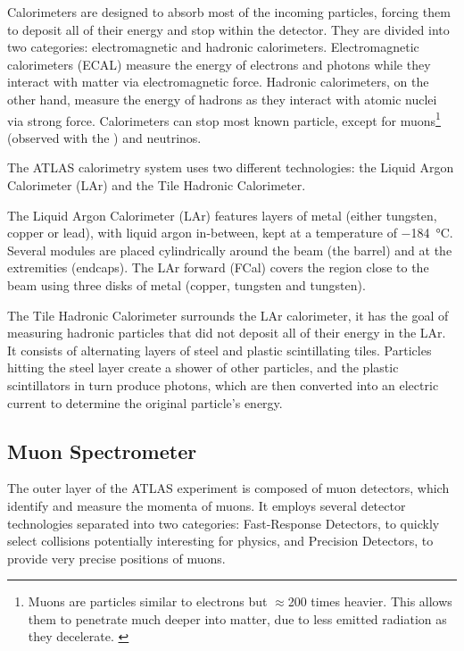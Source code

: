 Calorimeters are designed to absorb most of the incoming particles, forcing them to deposit all of their energy and stop within the detector. They are divided into two categories: electromagnetic and hadronic calorimeters. Electromagnetic calorimeters (ECAL) measure the energy of electrons and photons while they interact with matter via electromagnetic force. Hadronic calorimeters, on the other hand, measure the energy of hadrons as they interact with atomic nuclei via strong force. Calorimeters can stop most known particle, except for muons\footnote{Muons are particles similar to electrons but \(\approx\)200 times heavier. This allows them to penetrate much deeper into matter, due to less emitted radiation as they decelerate. \label{footnote:muons}} (observed with the ) and neutrinos.

The ATLAS calorimetry system uses two different technologies: the Liquid Argon Calorimeter (LAr) and the Tile Hadronic Calorimeter.

The Liquid Argon Calorimeter (LAr) features layers of metal (either tungsten, copper or lead), with liquid argon in-between, kept at a temperature of \qty{-184}{\degreeCelsius}. Several modules are placed cylindrically around the beam (the barrel) and at the extremities (endcaps). The LAr forward (FCal) covers the region close to the beam using three disks of metal (copper, tungsten and tungsten).

The Tile Hadronic Calorimeter surrounds the LAr calorimeter, it has the goal of measuring hadronic particles that did not deposit all of their energy in the LAr. It consists of alternating layers of steel and plastic scintillating tiles. Particles hitting the steel layer create a shower of other particles, and the plastic scintillators in turn produce photons, which are then converted into an electric current to determine the original particle's energy.

\subsection{Muon Spectrometer}\label{sec:muon_spectrometer}

The outer layer of the ATLAS experiment is composed of muon detectors, which identify and measure the momenta of muons. It employs several detector technologies separated into two categories: Fast-Response Detectors, to quickly select collisions potentially interesting for physics, and Precision Detectors, to provide very precise positions of muons.

